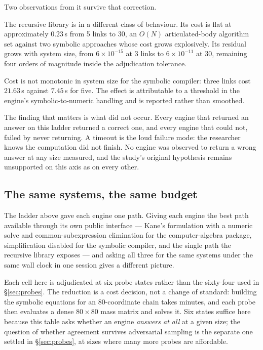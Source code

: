 \documentclass[review,12pt]{elsarticle}
\begin{document}
Two observations from it survive that correction.

The recursive library is in a different class of behaviour. Its cost is flat at
approximately $0.23$\,s from 5 links to 30, an $O(N)$ articulated-body algorithm
set against two symbolic approaches whose cost grows explosively. Its residual
grows with system size, from $6\times10^{-15}$ at 3 links to $6\times10^{-11}$
at 30, remaining four orders of magnitude inside the adjudication tolerance.

Cost is not monotonic in system size for the symbolic compiler: three links cost
$21.63$\,s against $7.45$\,s for five. The effect is attributable to a threshold
in the engine's symbolic-to-numeric handling and is reported rather than
smoothed.

The finding that matters is what did not occur. Every engine that returned an
answer on this ladder returned a correct one, and every engine that could not,
failed by never returning. A timeout is the loud failure mode: the researcher
knows the computation did not finish. No engine was observed to return a wrong
answer at any size measured, and the study's original hypothesis remains
unsupported on this axis as on every other.

\subsection{The same systems, the same budget}\label{sec:equalbudget}
The ladder above gave each engine one path. Giving each engine the best
path available through its own public interface --- Kane's formulation with a
numeric solve and common-subexpression elimination for the computer-algebra
package, simplification disabled for the symbolic compiler, and the single
path the recursive library exposes --- and asking all three for the same
systems under the same wall clock in one session gives a different picture.

Each cell here is adjudicated at six probe states rather than the sixty-four
used in \S\ref{sec:probes}. The reduction is a cost decision, not a change of
standard: building the symbolic equations for an 80-coordinate chain takes
minutes, and each probe then evaluates a dense $80\times80$ mass matrix and
solves it. Six states suffice here because this table asks whether an engine
\emph{answers at all} at a given size; the question of whether agreement
survives adversarial sampling is the separate one settled in \S\ref{sec:probes},
at sizes where many more probes are affordable.
\end{document}
